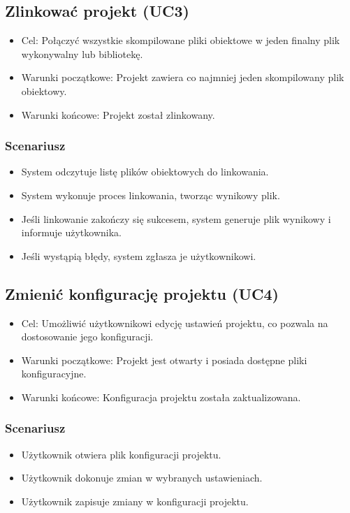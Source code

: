 \subsection{Zlinkować projekt (UC3)}
\begin{itemize}
    \item Cel: Połączyć wszystkie skompilowane pliki obiektowe w jeden finalny plik wykonywalny lub bibliotekę.
    \item Warunki początkowe: Projekt zawiera co najmniej jeden skompilowany plik obiektowy.
    \item Warunki końcowe: Projekt został zlinkowany.
\end{itemize}

\subsubsection{Scenariusz}
\begin{itemize}
    \item System odczytuje listę plików obiektowych do linkowania.
    \item System wykonuje proces linkowania, tworząc wynikowy plik.
    \item Jeśli linkowanie zakończy się sukcesem, system generuje plik wynikowy i informuje użytkownika.
    \item Jeśli wystąpią błędy, system zgłasza je użytkownikowi.
\end{itemize}

\subsection{Zmienić konfigurację projektu (UC4)}
\begin{itemize}
    \item Cel: Umożliwić użytkownikowi edycję ustawień projektu, co pozwala na dostosowanie jego konfiguracji.
    \item Warunki początkowe: Projekt jest otwarty i posiada dostępne pliki konfiguracyjne.
    \item Warunki końcowe: Konfiguracja projektu została zaktualizowana.
\end{itemize}

\subsubsection{Scenariusz}
\begin{itemize}
    \item Użytkownik otwiera plik konfiguracji projektu.
    \item Użytkownik dokonuje zmian w wybranych ustawieniach.
    \item Użytkownik zapisuje zmiany w konfiguracji projektu.
\end{itemize}

